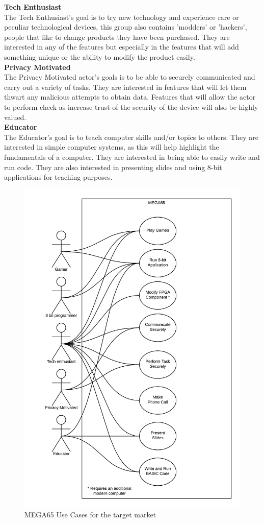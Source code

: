 \textbf{Tech Enthusiast}\\
The Tech Enthusiast's goal is to try new technology and experience rare or peculiar technological devices, this group also contains 'modders' or 'hackers', people that like to change products they have been purchased. They are interested in any of the features but especially in the features that will add something unique or the ability to modify the product easily.\\

\textbf{Privacy Motivated}\\
The Privacy Motivated actor's goals is to be able to securely communicated and carry out a variety of tasks. They are interested in features that will let them thwart any malicious attempts to obtain data. Features that will allow the actor to perform check as increase trust of the security of the device will also be highly valued. \\

\textbf{Educator}\\
The Educator's goal is to teach computer skills and/or topics to others. They are interested in simple computer systems, as this will help highlight the fundamentals of a computer. They are interested in being able to easily write and run code. They are also interested in presenting slides and using 8-bit applications for teaching purposes.\\

\begin{figure} \begin{center}
\includegraphics[width=.6\linewidth]{pics/MEGA65_use_case} 
\end{center} 
\caption{MEGA65 Use Cases for the target market\\}
\label{MEGA65_use_cases}
\end{figure}

